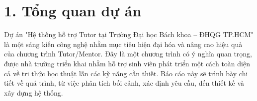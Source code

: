 \part*{1. Tổng quan dự án}
Dự án "Hệ thống hỗ trợ Tutor tại Trường Đại học Bách khoa – ĐHQG TP.HCM" là một sáng kiến công nghệ nhằm mục tiêu hiện đại hóa và nâng cao hiệu quả của chương trình Tutor/Mentor. Đây là một chương trình có ý nghĩa quan trọng, được nhà trường triển khai nhằm hỗ trợ sinh viên phát triển một cách toàn diện cả về tri thức học thuật lẫn các kỹ năng cần thiết. Báo cáo này sẽ trình bày chi tiết về quá trình, từ việc phân tích bối cảnh, xác định yêu cầu, đến thiết kế và xây dựng hệ thống.

